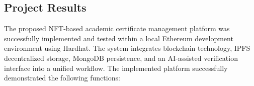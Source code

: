\subsection{Project Results}

    The proposed NFT-based academic certificate management platform was successfully implemented and tested within a local Ethereum development environment using Hardhat. The system integrates blockchain technology, IPFS decentralized storage, MongoDB persistence, and an AI-assisted verification interface into a unified workflow. The implemented platform successfully demonstrated the following functions:

    